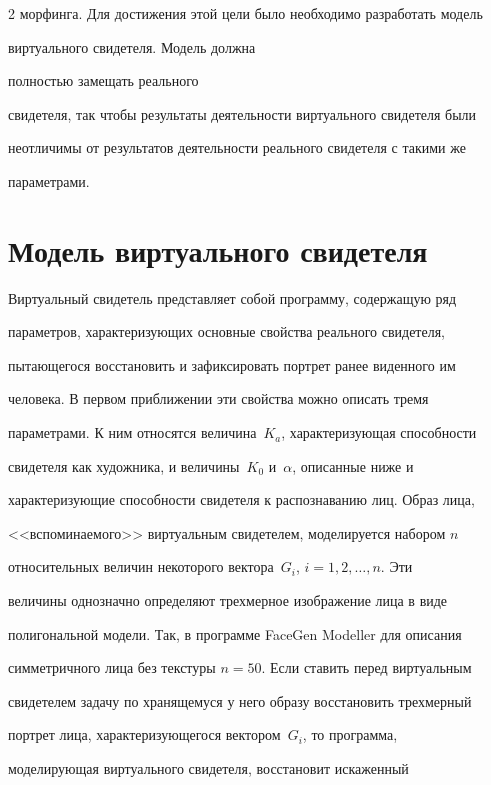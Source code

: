 \begin{multicols}{2}
морфинга. Для дости\-жения этой цели было необходимо разработать модель 


виртуального свидетеля. Модель должна %


пол\-ностью замещать реального 


свидетеля, так чтобы результаты деятельности виртуального свидетеля были 


неотличимы от результатов деятельности реального свидетеля с такими же 


параметрами.


     


\section{Модель виртуального свидетеля}


     


     Виртуальный свидетель представляет собой программу, содержащую ряд 


параметров, характеризующих основные свойства реального свидетеля, 


пытающегося восстановить и зафиксировать портрет ранее виденного им 


человека. В первом приближении эти свойства можно описать тремя 


параметрами. К ним относятся величина~$K_a$, характеризующая способности 


свидетеля как художника, и величины~$K_0$ и~$\alpha$, описанные ниже и 


характеризующие способности свидетеля к распознаванию лиц. Образ лица, 


<<вспоминаемого>> виртуальным свидетелем, моделируется набором $n$ 


относительных величин некоторого вектора~$G_i$, $i = 1, 2, \ldots , n$. Эти 


величины однозначно определяют трехмерное изображение лица в виде 


полигональной модели. Так, в программе FaceGen Modeller для описания 


симметричного лица без текстуры $n = 50$. Если ставить перед виртуальным 


свидетелем задачу по хранящемуся у него образу восстановить трехмерный 


портрет лица, характеризующегося вектором~$G_i$, то программа, 


моделирующая виртуального свидетеля, восстановит искаженный 



\end{multicols}
